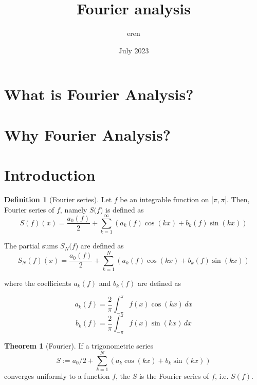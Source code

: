 \documentclass{article}
\title{Fourier analysis}
\author{eren}
\date{July 2023}
\theoremstyle{remark}
\theoremstyle{exercise}
\theoremstyle{definition}
\newtheorem{definition}{Definition}
\newtheorem{theorem}{Theorem}
\begin{document}
\maketitle

\section{What is Fourier Analysis?}
\section{Why Fourier Analysis?}

\section{Introduction}
\begin{definition}[Fourier series]\footnotemark{}
    Let \(f\) be an integrable function on [$\pi, \pi$]. Then, Fourier series of \(f\), namely $S($\(f\)) is defined as
    \[
    S(f)(x) = \frac{a_0(f)}{2} +  \sum_{k = 1}^{\infty} (a_k(f)  \cos(kx) + b_k(f)  \sin(kx))
    \]

    The partial sums $S_N($\(f\)) are defined as
    \[
    S_N(f)(x) = \frac{a_0(f)}{2} +  \sum_{k = 1}^{N} (a_k(f)  \cos(kx) + b_k(f)  \sin(kx))
    \]

    where the coefficients $a_k(f)$ and $b_k(f)$ are defined as

    \[
    a_k(f) = \frac{2}{\pi}\int_{-\pi}^{\pi} f(x) \cos(kx)\,dx
    \]
    \[
    b_k(f) = \frac{2}{\pi}\int_{-\pi}^{\pi} f(x) \sin(kx)\,dx
    \]
\end{definition}
\begin{theorem}[Fourier]
    If a trigonometric series
    \[
    S := a_0  / 2 +  \sum_{k = 1}^{N} (a_k  \cos(kx) + b_k  \sin(kx))
    \]
   converges uniformly to a function \(f\), the $S$ is the Fourier series of \(f\), i.e. $S(f)$.
\end{theorem}
\end{document}
